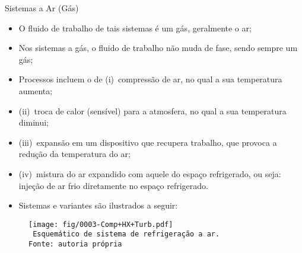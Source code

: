     \begin{frame}{Sistemas a Ar (Gás)}\vspace*{-0em}
        \begin{itemize}
            \item<1-> O \alert{fluido de trabalho} de tais sistemas é um \alert{gás}, geralmente
                o \alert{ar};
            \item<2-> Nos sistemas a gás, o fluido de trabalho \alert{não muda de fase}, sendo
                sempre um gás;
            \item<3-> Processos incluem o de (i)~\alert{compressão} de ar, no qual a sua
                temperatura \alert{aumenta};
            \item<4-> (ii)~\alert{troca de calor} (sensível) para a atmosfera, no qual a sua temperatura \alert{diminui};
            \item<5-> (iii)~\alert{expansão} em um dispositivo que recupera \alert{trabalho},
                que provoca a \alert{redução} da temperatura do ar;
            \item<6-> (iv)~\alert{mistura} do ar expandido com aquele do espaço refrigerado, ou
                seja: \alert{injeção de ar frio} diretamente no espaço refrigerado.
            \item<7-> Sistemas e variantes são ilustrados a seguir:
        \end{itemize}
    \end{frame}

    \begin{frame}\vspace*{-0em}
        \begin{center}
            \begin{figure}
                \fontsize{5.0}{5}\selectfont
                \texttt{[image: fig/0003-Comp+HX+Turb.pdf]}
                \\\vspace*{-0.0em}\texttt{%
                    Esquemático de sistema de refrigeração a ar.\\
                    Fonte: autoria própria
                }
            \end{figure}
        \end{center}
    \end{frame}

